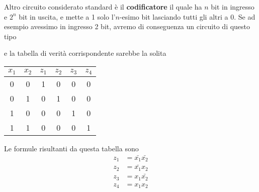 Altro circuito considerato standard è il \textbf{codificatore} il quale ha $n$ bit in ingresso e
$2^n$ bit in uscita, e mette a 1 solo l'$n$-esimo bit lasciando tutti gli altri a 0. Se ad esempio
avessimo in ingresso 2 bit, avremo di conseguenza un circuito di questo tipo
\begin{center}
\end{center}
e la tabella di verità corrispondente sarebbe la solita
\begin{center}
	\begin{tabular}{c c | c c c c}
		$x_1$ & $x_2$ & $z_1$ & $z_2$ & $z_3$ & $z_4$ \\ \hline
		0     & 0     & 1     & 0     & 0     & 0     \\
		0     & 1     & 0     & 1     & 0     & 0     \\
		1     & 0     & 0     & 0     & 1     & 0     \\
		1     & 1     & 0     & 0     & 0     & 1
	\end{tabular}
\end{center}
Le formule risultanti da questa tabella sono
\begin{align*}
	z_1 & = \bar{x_1} \bar{x_2} \\
	z_2 & = \bar{x_1} x_2       \\
	z_3 & = x_1 \bar{x_2}       \\
	z_4 & = x_1 x_2
\end{align*}
